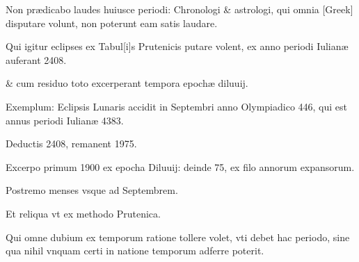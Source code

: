 Non prædicabo laudes huiusce periodi:
Chronologi \& astrologi, qui omnia \textgreek{[Greek]} disputare volunt,
non poterunt eam satis laudare.

Qui igitur eclipses ex Tabul[i]s
Prutenicis putare volent, ex anno periodi Iulianæ auferant 2408.

\&
cum residuo toto excerperant tempora epochæ diluuij.

Exemplum: Eclipsis
Lunaris accidit in Septembri anno Olympiadico 446, qui est annus
periodi Iulianæ 4383.

Deductis 2408, remanent 1975.

Excerpo
primum 1900 ex epocha Diluuij: deinde 75, ex filo annorum expansorum.

Postremo menses vsque ad Septembrem.

Et reliqua vt ex methodo
Prutenica.

Qui omne dubium ex temporum ratione tollere
volet, vti debet hac periodo, sine qua nihil vnquam certi in natione
 temporum adferre poterit.
